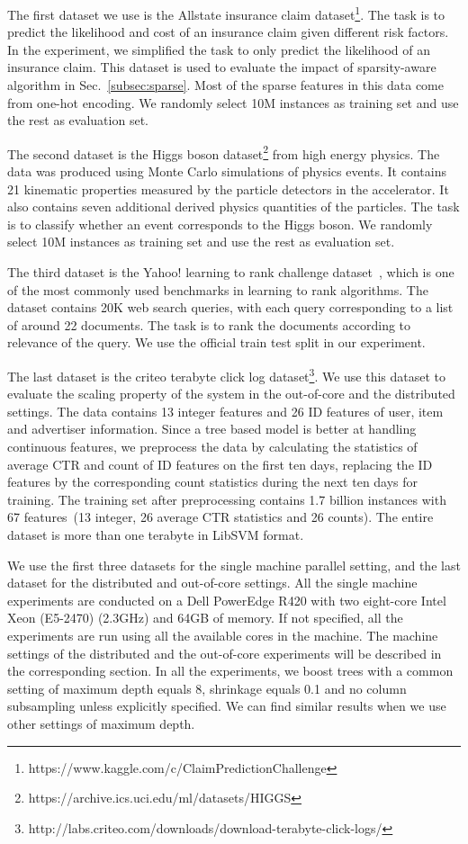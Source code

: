 The first dataset we use is the Allstate insurance claim dataset\footnote{https://www.kaggle.com/c/ClaimPredictionChallenge}.
The task is to predict the likelihood and cost of an insurance claim given different risk factors. In the experiment, we simplified the task to only predict the likelihood of an insurance claim. This dataset is used to evaluate the impact of sparsity-aware algorithm in Sec.~\ref{subsec:sparse}.
Most of the sparse features in this data come from one-hot encoding. We randomly select 10M instances as training set and use the rest as evaluation set.

The second dataset is the Higgs boson dataset\footnote{https://archive.ics.uci.edu/ml/datasets/HIGGS} from high energy physics. The data was produced using Monte Carlo simulations of physics events. It contains 21 kinematic properties measured by the particle detectors in the accelerator. It also contains seven additional derived physics quantities of the particles. The task is to classify whether an event corresponds to the Higgs boson. We randomly select 10M instances as training set and use the rest as evaluation set.

The third dataset is the Yahoo! learning to rank challenge dataset~\cite{YahooLTRC}, which is one of the most commonly used benchmarks in learning to rank algorithms. The dataset contains 20K web search queries, with each query corresponding to a list of around 22 documents. The task is to rank the documents according to relevance of the query. We use the official train test split in our experiment.

The last dataset is the criteo terabyte click log dataset\footnote{http://labs.criteo.com/downloads/download-terabyte-click-logs/}.
We use this dataset to evaluate the scaling property of the system in the out-of-core and the distributed settings. The data contains 13 integer features and 26 ID features of user, item and advertiser information. Since a tree based model is better at handling continuous features, we preprocess the data by calculating the statistics of average CTR and count of ID features on the first ten days,  replacing the ID features by the corresponding count statistics during the next ten days for training. The training set after preprocessing contains 1.7 billion instances with 67 features~(13 integer, 26 average CTR statistics and 26 counts). The entire dataset is more than one terabyte in LibSVM format.

We use the first three datasets for the single machine parallel setting, and the last dataset for the distributed and out-of-core settings. All the single machine experiments are conducted on a Dell PowerEdge R420 with two eight-core Intel Xeon (E5-2470) (2.3GHz) and 64GB of memory. If not specified, all the experiments are run using all the available cores in the machine. The machine settings of the distributed and the out-of-core experiments will be described in the corresponding section. In all the experiments, we boost trees with a common setting of maximum depth equals 8, shrinkage equals 0.1 and no column subsampling unless explicitly specified. We can find similar results when we use other settings of maximum depth.

